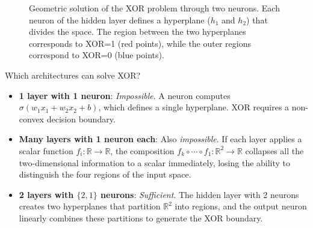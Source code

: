 \begin{figure}[h]
\centering
{}
\caption[Geometric solution of the XOR problem]{Geometric solution of the XOR problem through two neurons. Each neuron of the hidden layer defines a hyperplane ($h_1$ and $h_2$) that divides the space. The region between the two hyperplanes corresponds to XOR=1 (red points), while the outer regions correspond to XOR=0 (blue points).}
\label{fig:xor_geometrico}
\end{figure}

Which architectures can solve XOR?
\begin{itemize}
    \item \textbf{1 layer with 1 neuron}: \textit{Impossible}. A neuron computes $\sigma(w_1 x_1 + w_2 x_2 + b)$, which defines a single hyperplane. XOR requires a non-convex decision boundary.

    \item \textbf{Many layers with 1 neuron each}: Also \textit{impossible}. If each layer applies a scalar function $f_i: \mathbb{R} \to \mathbb{R}$, the composition $f_k \circ \cdots \circ f_1: \mathbb{R}^2 \to \mathbb{R}$ collapses all the two-dimensional information to a scalar immediately, losing the ability to distinguish the four regions of the input space.

    \item \textbf{2 layers with $\{2, 1\}$ neurons}: \textit{Sufficient}. The hidden layer with 2 neurons creates two hyperplanes that partition $\mathbb{R}^2$ into regions, and the output neuron linearly combines these partitions to generate the XOR boundary.
\end{itemize}

